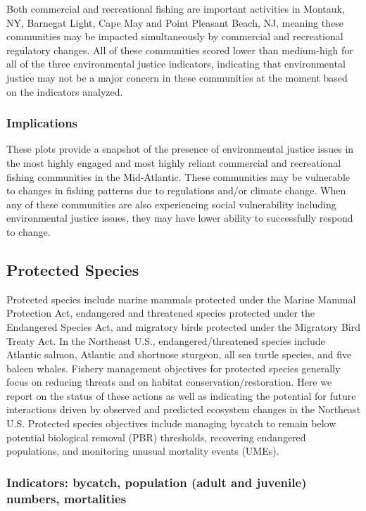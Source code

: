 \documentclass[
  10pt,
]{article}
\begin{document}
Both commercial and recreational fishing are important activities in
Montauk, NY, Barnegat Light, Cape May and Point Pleasant Beach, NJ,
meaning these communities may be impacted simultaneously by commercial
and recreational regulatory changes. All of these communities scored
lower than medium-high for all of the three environmental justice
indicators, indicating that environmental justice may not be a major
concern in these communities at the moment based on the indicators
analyzed.

\hypertarget{implications-4}{%
\subsubsection{Implications}\label{implications-4}}

These plots provide a snapshot of the presence of environmental justice
issues in the most highly engaged and most highly reliant commercial and
recreational fishing communities in the Mid-Atlantic. These communities
may be vulnerable to changes in fishing patterns due to regulations
and/or climate change. When any of these communities are also
experiencing social vulnerability including environmental justice
issues, they may have lower ability to successfully respond to change.

\hypertarget{protected-species}{%
\subsection{Protected Species}\label{protected-species}}

Protected species include marine mammals protected under the Marine
Mammal Protection Act, endangered and threatened species protected under
the Endangered Species Act, and migratory birds protected under the
Migratory Bird Treaty Act. In the Northeast U.S., endangered/threatened
species include Atlantic salmon, Atlantic and shortnose sturgeon, all
sea turtle species, and five baleen whales. Fishery management
objectives for protected species generally focus on reducing threats and
on habitat conservation/restoration. Here we report on the status of
these actions as well as indicating the potential for future
interactions driven by observed and predicted ecosystem changes in the
Northeast U.S. Protected species objectives include managing bycatch to
remain below potential biological removal (PBR) thresholds, recovering
endangered populations, and monitoring unusual mortality events (UMEs).

\hypertarget{indicators-bycatch-population-adult-and-juvenile-numbers-mortalities}{%
\subsubsection{Indicators: bycatch, population (adult and juvenile)
numbers,
mortalities}\label{indicators-bycatch-population-adult-and-juvenile-numbers-mortalities}}
\end{document}
